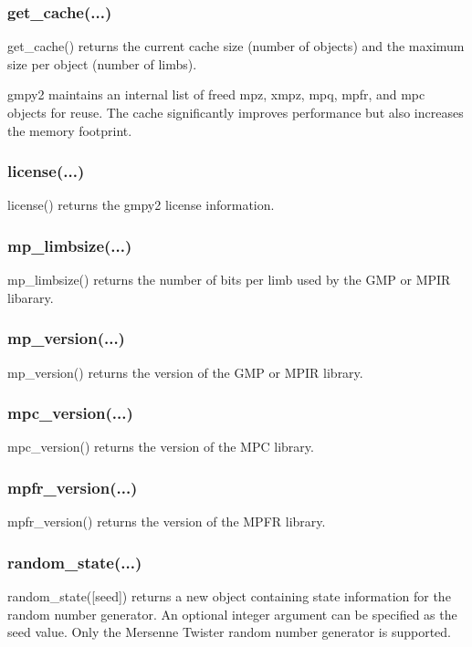 \subsubsection{get\_cache(...)}

get\_cache() returns the current cache size (number of objects) and the maximum size per
object (number of limbs).

gmpy2 maintains an internal list of freed mpz, xmpz, mpq, mpfr, and mpc objects for reuse.
The cache significantly improves performance but also increases the memory footprint.

\subsubsection{license(...)}

license() returns the gmpy2 license information.

\subsubsection{mp\_limbsize(...)}

mp\_limbsize() returns the number of bits per limb used by the GMP or MPIR libarary.

\subsubsection{mp\_version(...)}

mp\_version() returns the version of the GMP or MPIR library.

\subsubsection{mpc\_version(...)}

mpc\_version() returns the version of the MPC library.

\subsubsection{mpfr\_version(...)}

mpfr\_version() returns the version of the MPFR library.

\subsubsection{random\_state(...)}

random\_state([seed]) returns a new object containing state information for the random number
generator. An optional integer argument can be specified as the seed value. Only the
Mersenne Twister random number generator is supported.

